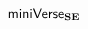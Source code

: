 \vspace{-3px}
\section{\texorpdfstring{$\mathsf{miniVerse}_\textbf{SE}$}{miniVerseSE}}\label{sec:tsms-minimal-formalism}\label{sec:miniVerseU}
\vspace{-3px}
